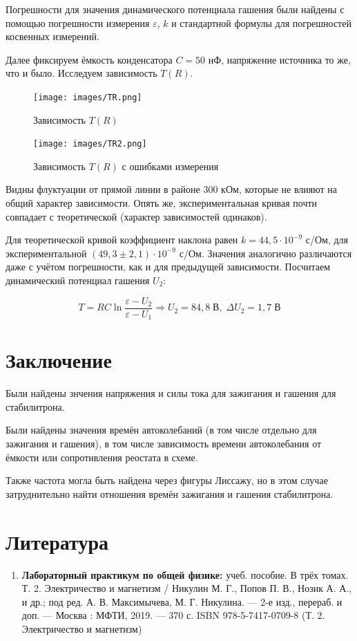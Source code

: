 \documentclass[a4paper, 12pt]{article}%
\begin{document}
Погрешности для значения динамического потенциала гашения были найдены с помощью погрешности измерения $\varepsilon$, $k$ и стандартной формулы для погрешностей косвенных измерений.

Далее фиксируем ёмкость конденсатора $C = 50$ нФ, напряжение источника то же, что и было. Исследуем зависимость $T(R)$.

\begin{figure}[h!]
    \centering
    \texttt{[image: images/TR.png]}
    \caption{Зависимость $T(R)$}
    \label{TR}
\end{figure}

\begin{figure}[h!]
    \centering
    \texttt{[image: images/TR2.png]}
    \caption{Зависимость $T(R)$ с ошибками измерения}
    \label{TR2}
\end{figure}

Видны флуктуации от прямой линии в районе $300$ кОм, которые не влияют на общий характер зависимости. Опять же, экспериментальная кривая почти совпадает с теоретической (характер зависимостей одинаков).

Для теоретической кривой коэффициент наклона равен $k = 44,5 \cdot 10^{-9}$ с/Ом, для экспериментальной $(49,3 \pm 2,1) \cdot 10^{-9}$ с/Ом. Значения аналогично различаются даже с учётом погрешности, как и для предыдущей зависимости. Посчитаем динамический потенциал гашения $U_2$:

\begin{equation}
    T = RC \ln{\frac{\varepsilon - U_2}{\varepsilon - U_1}} \Rightarrow U_2 = 84,8 \; \text{В}, \; \Delta U_2 = 1,7 \; \text{В}
\end{equation}


\section{Заключение}

Были найдены знчения напряжения и силы тока для зажигания и гашения для стабилитрона. 

Были найдены значения времён автоколебаний (в том числе отдельно для зажигания и гашения), в том числе зависимость времени автоколебания от ёмкости или сопротивления реостата в схеме.

Также частота могла быть найдена через фигуры Лиссажу, но в этом случае затруднительно найти отношения времён зажигания и гашения стабилитрона.


\section{Литература}

\begin{enumerate}
\item \textbf{Лабораторный практикум по общей физике:} учеб. пособие. В трёх томах. Т. 2. Электричество и магнетизм /
Никулин М. Г., Попов П. В., Нозик А. А., и др.; под ред. А. В. Мак­симычева, М. Г. Никулина. — 2-е изд., перераб. и доп. — Москва : МФТИ, 2019. — 370 с.
ISBN 978-5-7417-0709-8 (Т. 2. Электричество и магнетизм)
\end{enumerate}		
		
\end{document}
